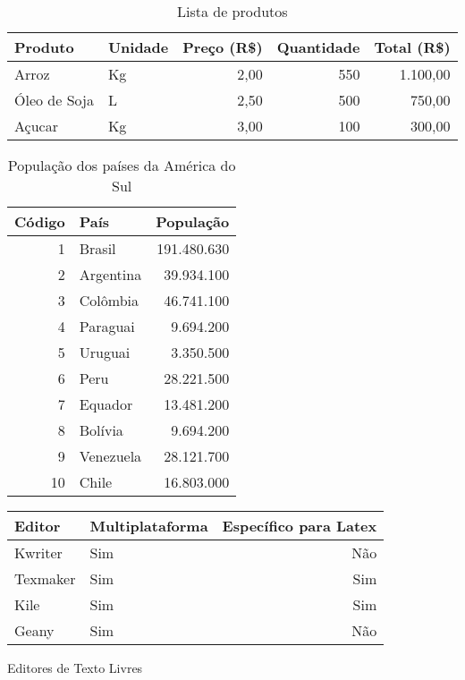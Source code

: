 \begin{table}[htb] \centering
\caption{Lista de produtos} \label{tabela:lista_produtos}
\begin{tabularx}{\textwidth}{X|l|r|r|r} \hline
Produto      & Unidade & Preço (R\$) & Quantidade & Total (R\$) \\ \hline
Arroz        & Kg      & 2,00        & 550        & 1.100,00    \\
Óleo de Soja & L       & 2,50        & 500        & 750,00      \\
Açucar       & Kg      & 3,00        & 100        & 300,00      \\ \hline
\end{tabularx}
\end{table}

\begin{table}[htb] \centering
\caption{População dos países da América do Sul} \label{tabela:populacao_america_sul}
\begin{tabular}{r|l|r}        \hline
Código  & País            & População   \\ \hline
1       & Brasil          & 191.480.630 \\
2       & Argentina       &  39.934.100 \\
3       & Colômbia        &  46.741.100 \\
4       & Paraguai        &   9.694.200 \\
5       & Uruguai         &   3.350.500 \\
6       & Peru            &  28.221.500 \\
7       & Equador         &  13.481.200 \\
8       & Bolívia         &   9.694.200 \\
9       & Venezuela       &  28.121.700 \\
10      & Chile           &  16.803.000 \\ \hline
\end{tabular}
\end{table}

\begin{quadro}[htb] \centering
\begin{tabular}{|l|l|r|}        \hline
Editor     & Multiplataforma & Específico para Latex \\ \hline
Kwriter    & Sim             & Não                   \\
Texmaker   & Sim             & Sim                   \\
Kile       & Sim             & Sim                   \\
Geany      & Sim             & Não                   \\ \hline
\end{tabular}
\caption{Editores de Texto Livres} \label{quadro:editores_texto_livres}
\end{quadro}

